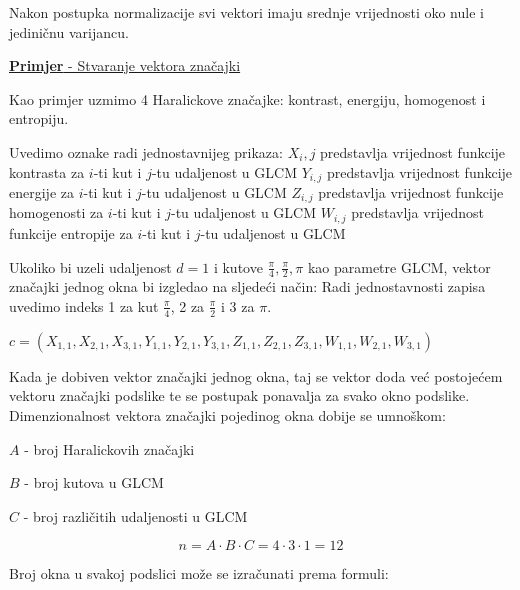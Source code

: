 \documentclass[times, utf8, zavrsni, numeric]{fer}
\begin{document}
Nakon postupka normalizacije svi vektori imaju srednje vrijednosti oko nule
i jediničnu varijancu. 

\bigbreak
\underline{\textbf{Primjer} - Stvaranje vektora značajki}
\bigbreak

Kao primjer uzmimo 4 Haralickove značajke: kontrast, energiju, homogenost i entropiju. 

\bigbreak

Uvedimo oznake radi jednostavnijeg prikaza: 
\newline \(X_i,j\) predstavlja vrijednost funkcije kontrasta za \(i\)-ti
kut i \(j\)-tu udaljenost u GLCM
\newline \(Y_{i,j}\) predstavlja vrijednost funkcije energije za \(i\)-ti
kut i \(j\)-tu udaljenost u GLCM
\newline \(Z_{i,j}\) predstavlja vrijednost funkcije homogenosti za \(i\)-ti
kut i \(j\)-tu udaljenost u GLCM
\newline \(W_{i,j}\) predstavlja vrijednost funkcije entropije za \(i\)-ti
kut i \(j\)-tu udaljenost u GLCM

\bigbreak

Ukoliko bi uzeli udaljenost \(d=1\) i kutove \(\frac{\pi}{4}, \frac{\pi}{2}, \pi\)
kao parametre GLCM, vektor značajki jednog okna bi izgledao na sljedeći način:
\bigbreak
Radi jednostavnosti zapisa uvedimo indeks 1 za kut \(\frac{\pi}{4}\), 2 za
\(\frac{\pi}{2}\) i 3 za \(\pi\).

\bigbreak

\(
c = \left(X_{1,1}, X_{2,1}, X_{3,1}, Y_{1,1}, Y_{2,1}, Y_{3,1}, Z_{1,1}, 
Z_{2,1}, Z_{3,1}, W_{1,1}, W_{2,1}, W_{3,1}\right)
\)

\bigbreak

Kada je dobiven vektor značajki jednog okna, taj se vektor doda već postojećem 
vektoru značajki podslike te se postupak ponavalja za svako okno podslike.
\newline
Dimenzionalnost vektora značajki pojedinog okna dobije se umnoškom:

\begin{center}

\(A\) - broj Haralickovih značajki

\(B\) - broj kutova u GLCM

\(C\) - broj različitih udaljenosti u GLCM

\end{center}
\[
n = A \cdot B \cdot C = 4 \cdot 3 \cdot 1 = 12
\]

Broj okna u svakoj podslici može se izračunati prema formuli:
\end{document}

